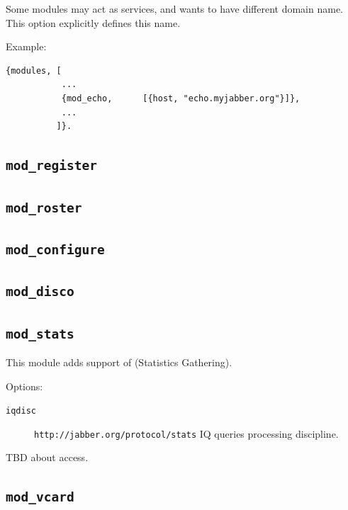 \documentclass[10pt]{article}
\newcommand{\ns}[1]{\texttt{#1}}
\newcommand{\modregister}{\texttt{mod\_register}}
\newcommand{\modroster}{\texttt{mod\_roster}}
\newcommand{\modconfigure}{\texttt{mod\_configure}}
\newcommand{\moddisco}{\texttt{mod\_disco}}
\newcommand{\modstats}{\texttt{mod\_stats}}
\newcommand{\modvcard}{\texttt{mod\_vcard}}
\begin{document}
Some modules may act as services, and wants to have different domain name.
This option explicitly defines this name.

Example:
\begin{verbatim}
{modules, [
           ...
           {mod_echo,      [{host, "echo.myjabber.org"}]},
           ...
          ]}.
\end{verbatim}



\subsection{\modregister{}}
\label{sec:modregister}



\subsection{\modroster{}}
\label{sec:modroster}



\subsection{\modconfigure{}}
\label{sec:modconfigure}



\subsection{\moddisco{}}
\label{sec:moddisco}



\subsection{\modstats{}}
\label{sec:modstats}

This module adds support of
 (Statistics Gathering).

Options:
\begin{description}
\item[\texttt{iqdisc}] \ns{http://jabber.org/protocol/stats} IQ queries
  processing discipline.
\end{description}

TBD about access.

\subsection{\modvcard{}}
\label{sec:modvcard}
\end{document}
